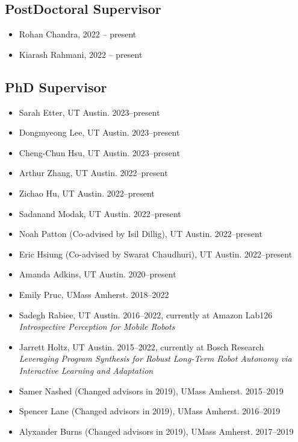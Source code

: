 \documentclass[Times]{article}
\begin{document}
\subsection*{PostDoctoral Supervisor}
\begin{itemize}
 \item Rohan Chandra, 2022 -- present
 \item Kiarash Rahmani, 2022 -- present
\end{itemize}

\subsection*{PhD Supervisor}
\begin{itemize}
  \item Sarah Etter, UT Austin. 2023--present
  \item Dongmyeong Lee, UT Austin. 2023--present
  \item Cheng-Chun Hsu, UT Austin. 2023--present
  \item Arthur Zhang, UT Austin. 2022--present
  \item Zichao Hu, UT Austin. 2022--present
  \item Sadanand Modak, UT Austin. 2022--present
  \item Noah Patton (Co-advised by Isil Dillig), UT Austin. 2022--present
  \item Eric Hsiung (Co-advised by Swarat Chaudhuri), UT Austin. 2022--present
  \item Amanda Adkins, UT Austin. 2020--present
  \item Emily Pruc, UMass Amherst. 2018--2022
  \item Sadegh Rabiee, UT Austin. 2016--2022, currently at Amazon Lab126 \\
  \emph{Introspective Perception for Mobile Robots}
  \item Jarrett Holtz, UT Austin. 2015--2022, currently at Bosch Research \\
  \emph{Leveraging Program Synthesis for Robust Long-Term Robot Autonomy via\\ Interactive Learning and Adaptation}
  \item Samer Nashed (Changed advisors in 2019), UMass Amherst. 2015--2019
  \item Spencer Lane (Changed advisors in 2019), UMass Amherst. 2016--2019
  \item Alyxander Burns (Changed advisors in 2019), UMass Amherst. 2017--2019
\end{itemize}
\end{document}

